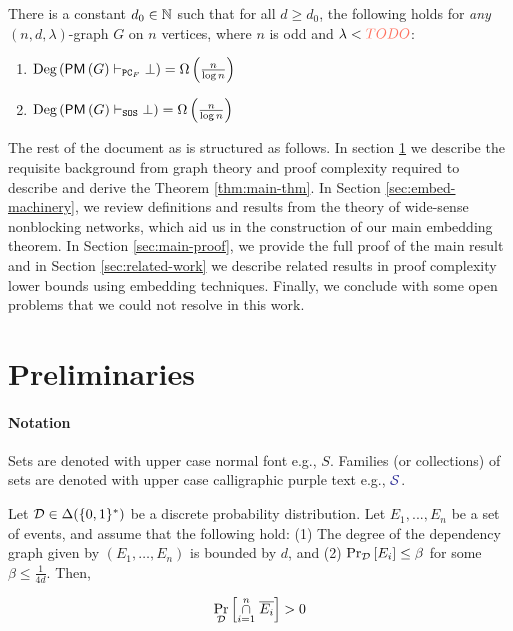 \documentclass[11pt]{article}
\begin{document}
\begin{theorem}\label{thm:main-thm}
There is a constant $d_0 \in \mathbb{N}$ such that for all $d \geq d_0$, the following holds  for \emph{any} $(n, d, \lambda)$-graph $G$ on $n$ vertices, where $n$ is odd and $\lambda < \highlight{TODO}$:
\begin{enumerate}
    \item{ $\text{Deg}\left(\mathsf{PM}\left(G\right) \vdash_{\texttt{PC}_F} \bot\right) = \Omega\left(\frac{n}{\log n}\right)$} 
    \item{$\text{Deg}\left(\mathsf{PM}\left(G\right) \vdash_{\texttt{SOS}} \bot\right) = \Omega\left(\frac{n}{\log n}\right)$}
\end{enumerate}

\end{theorem}

The rest of the document as is structured as follows. In section \ref{sec:prelims} we describe the requisite background from graph theory and proof complexity required to describe and derive the Theorem \ref{thm:main-thm}.
In Section \ref{sec:embed-machinery}, we review definitions and results from the theory of wide-sense nonblocking networks, which aid us in the construction of our main embedding theorem.
In Section \ref{sec:main-proof}, we provide the full proof of the main result and in Section \ref{sec:related-work} we describe related results in proof complexity lower bounds using embedding techniques.
Finally, we conclude with some open problems that we could not resolve in this work.


\section{Preliminaries}
\label{sec:prelims}

\paragraph{Notation} Sets are denoted with upper case normal font e.g., $S$. Families (or collections) of sets are denoted with upper case calligraphic purple text e.g., $\Family{S}$. 


\begin{definition}\label{def:dep-graphs}
	
\end{definition}

\begin{lemma}\label{lemma:lll}Let $\mathcal{D} \in \Delta(\{0,1\}^*)$ be a discrete probability distribution.
Let $E_1,...,E_n$ be a set of events, and assume that the following hold: (1) The degree of the dependency graph given by $(E_1, \dots, E_n)$ is bounded by $d$, and (2) $\Pr_{\mathcal{D}}\left[E_i \right] \leq \beta$ for some $\beta \leq \frac{1}{4d}$. Then,

\[ \Pr_{\mathcal{D}}\left[\overset{n}{ \underset{i=1}{\cap}} \hspace{0.1cm}  \overline{E_i} \right] > 0\]	
	
\end{lemma}
\end{document}
